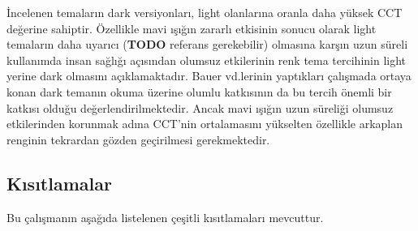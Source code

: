 \documentclass{article}
\begin{document}
İncelenen temaların dark versiyonları, light olanlarına oranla daha yüksek CCT değerine sahiptir. Özellikle mavi ışığın zararlı etkisinin sonucu olarak light temaların daha uyarıcı (\textbf{TODO} referans gerekebilir) olmasına karşın uzun süreli kullanımda insan sağlığı açısından olumsuz etkilerinin renk tema tercihinin light yerine dark olmasını açıklamaktadır. Bauer vd.lerinin \cite{bauer1980improving} yaptıkları çalışmada ortaya konan dark temanın okuma üzerine olumlu katkısının da bu tercih önemli bir katkısı olduğu değerlendirilmektedir. Ancak mavi ışığın uzun süreliği olumsuz etkilerinden korunmak adına CCT'nin ortalamasını yükselten özellikle arkaplan renginin tekrardan gözden geçirilmesi gerekmektedir.

\begin{comment}
Implications – The study indicates that individuals use Dark Mode for a more satisfying user experience as they feel e.g. less eye strain with a dark themed user interface. Editing and coding software is mostly designed in a light-on-dark color scheme, as users often work for long continuous hours on screen, surrounded by dark environment. As screen time per individual increases, more users are experiencing ocular diseases. In counteraction, society demanded dark themed interfaces for operating systems, websites, and apps. As individuals were already using unofficial dark themes on different interfaces, tech companies started releasing system updates to make Dark Mode a choice. As Apple released their user interface update just in 2019, Dark Mode is still a relevant trend discussed in the industry and society. Experts indicate that Dark Mode is here to stay, as it satisfies preferences of many users and makes current OLED screens and future digital devices with appropriate display technology more sustainable \cite{eisfeld2020rise}
\end{comment}

\subsection{Kısıtlamalar}

Bu çalışmanın aşağıda listelenen çeşitli kısıtlamaları mevcuttur.
\end{document}
